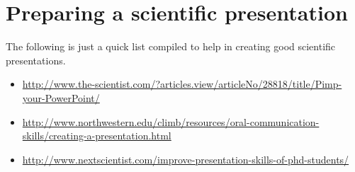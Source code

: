 \section{Preparing a scientific presentation}
The following is just a quick list compiled to help in creating good scientific presentations.
\begin{itemize}
\item \url{http://www.the-scientist.com/?articles.view/articleNo/28818/title/Pimp-your-PowerPoint/}
\item \url{http://www.northwestern.edu/climb/resources/oral-communication-skills/creating-a-presentation.html}
\item \url{http://www.nextscientist.com/improve-presentation-skills-of-phd-students/}
\end{itemize}




